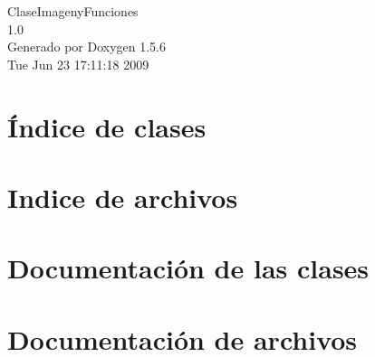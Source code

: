 \documentclass[a4paper]{book}
\begin{document}
\begin{titlepage}
\vspace*{7cm}
\begin{center}
{\Large ClaseImagenyFunciones \\[1ex]\large 1.0 }\\
\vspace*{1cm}
{\large Generado por Doxygen 1.5.6}\\
\vspace*{0.5cm}
{\small Tue Jun 23 17:11:18 2009}\\
\end{center}
\end{titlepage}
\clearemptydoublepage
{}
\tableofcontents
\clearemptydoublepage
{}
\chapter{Índice de clases}

\chapter{Indice de archivos}

\chapter{Documentación de las clases}

\chapter{Documentación de archivos}













\printindex
\end{document}
